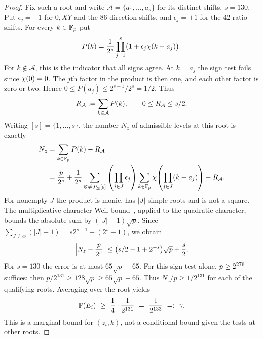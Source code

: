 \begin{proof}
Fix such a root and write $\mathcal A=\{a_1,\ldots,a_s\}$ for its distinct shifts, $s=130$. Put $\epsilon_j=-1$ for $0,XY$ and the 86 direction shifts, and $\epsilon_j=+1$ for the 42 ratio shifts. For every $k\in\mathbb F_p$ put
\[
  \mathcopy{P(k) = 2^(-s) product_{j=1}^s (1 + epsilon_j chi(k - a_j)).}{P(k)=\frac{1}{2^s}\prod_{j=1}^{s}\bigl(1+\epsilon_j\ch(k-a_j)\bigr).}
\]
For $k\notin\mathcal A$, this is the indicator that all signs agree. At $k=a_j$ the sign test fails since $\chi(0)=0$. The $j$th factor in the product is then one, and each other factor is zero or two. Hence $0\le P(a_j)\le 2^{s-1}/2^s=1/2$. Thus
\[
  \mathcopy{R_A = sum_{k in A} P(k), with 0 <= R_A <= s/2.}{R_{\mathcal A}:=\sum_{k\in\mathcal A}P(k),\qquad 0\le R_{\mathcal A}\le s/2.}
\]
Writing $[s]=\{1,\ldots,s\}$, the number $N_z$ of admissible levels at this root is exactly
\[
\mathcopy{N_z = sum_{k in F_p} P(k) - R_A = p/2^s + 2^(-s) sum_{nonempty J in powerset([s])} (product_{j in J} epsilon_j) sum_{k in F_p} chi(product_{j in J} (k - a_j)) - R_A.}{\begin{aligned}
  N_z&=\sum_{k\in\F} P(k)-R_{\mathcal A}\\
     &=\frac{p}{2^s}
       +\frac{1}{2^s}\sum_{\varnothing\ne J\subseteq[s]}
         \left(\prod_{j\in J}\epsilon_j\right)
         \sum_{k\in\F}\ch\!\left(\prod_{j\in J}(k-a_j)\right)
       -R_{\mathcal A}.
\end{aligned}}
\]
For nonempty $J$ the product is monic, has $|J|$ simple roots and is not a square. The multiplicative-character Weil bound~\cite[Theorem 5.41]{weil}, applied to the quadratic character, bounds the absolute sum by $(|J|-1)\sqrt p$. Since $\sum_{J\ne\varnothing}(|J|-1)=s2^{s-1}-(2^s-1)$, we obtain
\[
  \mathcopy{|N_z - p/2^s| <= (s/2 - 1 + 2^(-s)) sqrt(p) + s/2.}{\left|N_z-\frac{p}{2^s}\right|\le \bigl(s/2-1+2^{-s}\bigr)\sqrt p+\frac{s}{2}.}
\]
For $s=130$ the error is at most $65\sqrt p+65$. For this sign test alone, $\mathcopy{p >= 2^276}{p\ge 2^{276}}$ suffices: then $p/2^{131}\ge128\sqrt p\ge65\sqrt p+65$. Thus $N_z/p\ge 1/2^{131}$ for each of the qualifying roots. Averaging over the root yields
\[
  \mathcopy{Pr(E_i) >= (1/4) * 2^(-131) = 2^(-133) = gamma.}{\Prob(E_i)\ \ge\ \frac{1}{4}\cdot\frac{1}{2^{131}}\ =\ \frac{1}{2^{133}}\ =:\ \gamma.}
\]
This is a marginal bound for $(z_i,k)$, not a conditional bound given the tests at other roots.
\end{proof}


